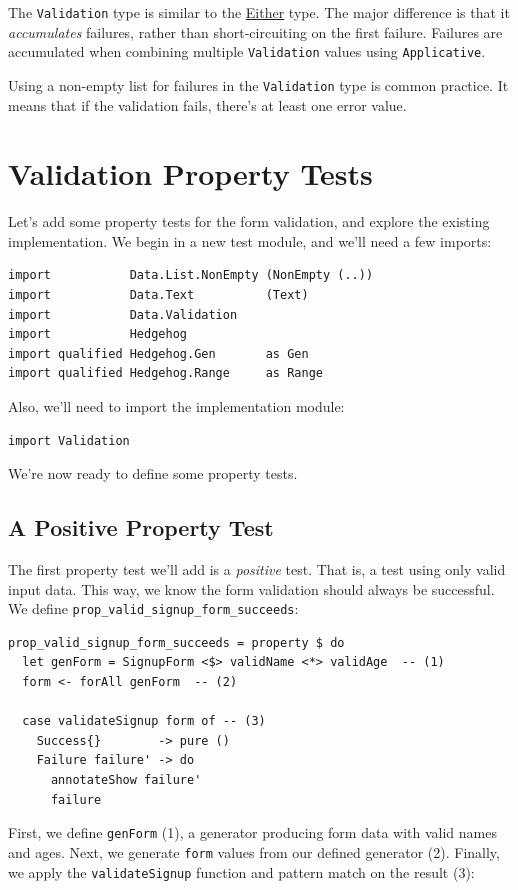 The \texttt{Validation} type is similar to the
\href{https://hackage.haskell.org/package/base-4.12.0.0/docs/Data-Either.html\#t:Either}{Either}
type. The major difference is that it \emph{accumulates} failures,
rather than short-circuiting on the first failure. Failures are
accumulated when combining multiple \texttt{Validation} values using
\texttt{Applicative}.

Using a non-empty list for failures in the \texttt{Validation} type is
common practice. It means that if the validation fails, there's at least
one error value.

\section{Validation Property Tests}\label{validation-property-tests}

Let's add some property tests for the form validation, and explore the
existing implementation. We begin in a new test module, and we'll need a
few imports:

\begin{verbatim}
import           Data.List.NonEmpty (NonEmpty (..))
import           Data.Text          (Text)
import           Data.Validation
import           Hedgehog
import qualified Hedgehog.Gen       as Gen
import qualified Hedgehog.Range     as Range
\end{verbatim}
Also, we'll need to import the implementation module:

\begin{verbatim}
import Validation
\end{verbatim}
We're now ready to define some property tests.

\subsection{A Positive Property
Test}\label{a-positive-property-test}

The first property test we'll add is a \emph{positive} test. That is, a
test using only valid input data. This way, we know the form validation
should always be successful. We define
\texttt{prop\_valid\_signup\_form\_succeeds}:

\begin{verbatim}
prop_valid_signup_form_succeeds = property $ do
  let genForm = SignupForm <$> validName <*> validAge  -- (1)
  form <- forAll genForm  -- (2)

  case validateSignup form of -- (3)
    Success{}        -> pure ()
    Failure failure' -> do
      annotateShow failure'
      failure
\end{verbatim}
First, we define \texttt{genForm} (1), a generator producing form data
with valid names and ages. Next, we generate \texttt{form} values from
our defined generator (2). Finally, we apply the \texttt{validateSignup}
function and pattern match on the result (3):

